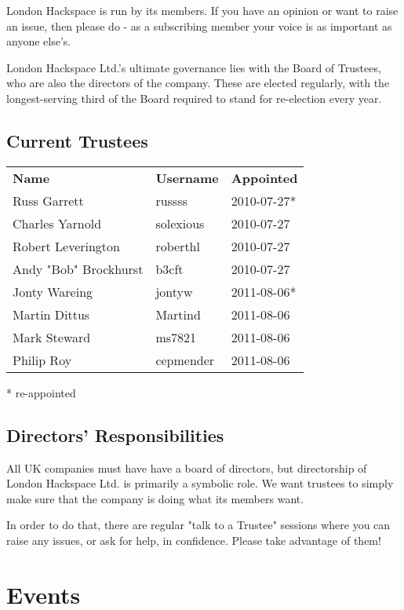 \documentclass[11pt,a5paper,twoside]{memoir}
\begin{document}
London Hackspace is run by its members. If you have an opinion or want to raise an issue, then please do - as a subscribing member your voice is as important as anyone else's.

London Hackspace Ltd.'s ultimate governance lies with the Board of Trustees, who are also the directors of the company. These are elected regularly, with the longest-serving third of the Board required to stand for re-election every year.

\subsection{Current Trustees}

\begin{tabular}{lll}
	\textbf{Name}         & \textbf{Username} & \textbf{Appointed} \\
	Russ Garrett          & russss    & 2010-07-27* \\
	Charles Yarnold       & solexious & 2010-07-27 \\
	Robert Leverington    & roberthl  & 2010-07-27 \\
	Andy "Bob" Brockhurst & b3cft     & 2010-07-27 \\
	Jonty Wareing         & jontyw    & 2011-08-06* \\
	Martin Dittus         & Martind   & 2011-08-06 \\
	Mark Steward          & ms7821    & 2011-08-06 \\
	Philip Roy            & cepmender & 2011-08-06 \\
\end{tabular}

* re-appointed

\subsection{Directors' Responsibilities}

All UK companies must have have a board of directors, but directorship of London Hackspace Ltd. is primarily a symbolic role. We want trustees to simply make sure that the company is doing what its members want.

In order to do that, there are regular "talk to a Trustee" sessions where you can raise any issues, or ask for help, in confidence. Please take advantage of them!


\section{Events}
\end{document}
